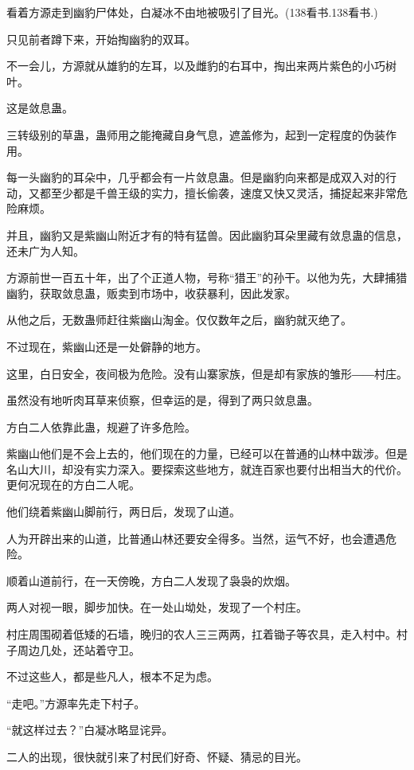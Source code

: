 
\begin{this_body}

看着方源走到幽豹尸体处，白凝冰不由地被吸引了目光。(138看书.138看书.)

只见前者蹲下来，开始掏幽豹的双耳。

不一会儿，方源就从雄豹的左耳，以及雌豹的右耳中，掏出来两片紫色的小巧树叶。

这是敛息蛊。

三转级别的草蛊，蛊师用之能掩藏自身气息，遮盖修为，起到一定程度的伪装作用。

每一头幽豹的耳朵中，几乎都会有一片敛息蛊。但是幽豹向来都是成双入对的行动，又都至少都是千兽王级的实力，擅长偷袭，速度又快又灵活，捕捉起来非常危险麻烦。

并且，幽豹又是紫幽山附近才有的特有猛兽。因此幽豹耳朵里藏有敛息蛊的信息，还未广为人知。

方源前世一百五十年，出了个正道人物，号称“猎王”的孙干。以他为先，大肆捕猎幽豹，获取敛息蛊，贩卖到市场中，收获暴利，因此发家。

从他之后，无数蛊师赶往紫幽山淘金。仅仅数年之后，幽豹就灭绝了。

不过现在，紫幽山还是一处僻静的地方。

这里，白日安全，夜间极为危险。没有山寨家族，但是却有家族的雏形――村庄。

虽然没有地听肉耳草来侦察，但幸运的是，得到了两只敛息蛊。

方白二人依靠此蛊，规避了许多危险。

紫幽山他们是不会上去的，他们现在的力量，已经可以在普通的山林中跋涉。但是名山大川，却没有实力深入。要探索这些地方，就连百家也要付出相当大的代价。更何况现在的方白二人呢。

他们绕着紫幽山脚前行，两日后，发现了山道。

人为开辟出来的山道，比普通山林还要安全得多。当然，运气不好，也会遭遇危险。

顺着山道前行，在一天傍晚，方白二人发现了袅袅的炊烟。

两人对视一眼，脚步加快。在一处山坳处，发现了一个村庄。

村庄周围砌着低矮的石墙，晚归的农人三三两两，扛着锄子等农具，走入村中。村子周边几处，还站着守卫。

不过这些人，都是些凡人，根本不足为虑。

“走吧。”方源率先走下村子。

“就这样过去？”白凝冰略显诧异。

二人的出现，很快就引来了村民们好奇、怀疑、猜忌的目光。


\end{this_body}
